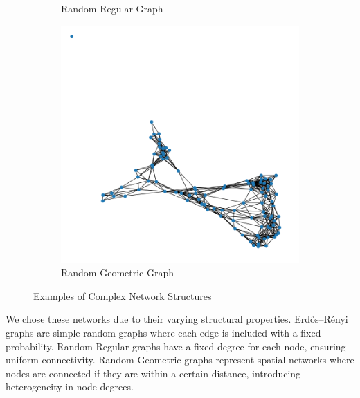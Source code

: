 \begin{figure}[H]
\begin{subfigure}{0.33\textwidth}
        \caption{Random Regular Graph}
        \label{fig:random_regular_graph}
    \end{subfigure}
    \begin{subfigure}{0.33\textwidth}
        \centering
        \includegraphics[width=\textwidth]{img/random_geometric_graph.png}
        \caption{Random Geometric Graph}
        \label{fig:random_geometric_graph}
    \end{subfigure}
    \caption{Examples of Complex Network Structures}
    \label{fig:network_types}
\end{figure}

We chose these networks due to their varying structural properties. Erdős–Rényi graphs are simple random graphs where each edge is included with a fixed probability. Random Regular graphs have a fixed degree for each node, ensuring uniform connectivity. Random Geometric graphs represent spatial networks where nodes are connected if they are within a certain distance, introducing heterogeneity in node degrees.\\


